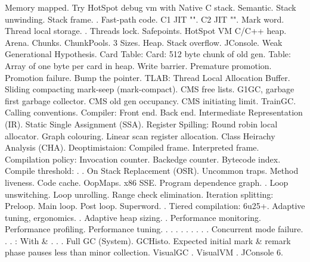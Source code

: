 \I Memory mapped.
\lskip
\I Try HotSpot debug vm with 
\I Native C stack.
\I Semantic.
\I Stack unwinding.
\I Stack frame.
\I {}.
\I Fast-path code.
\I C1 JIT "".
\I C2 JIT "".
\I Mark word.
\I Thread local storage.
\I {}.
\I Threads lock.
\I Safepoints.
\I HotSpot VM C/C++ heap.
\II Arena.
\II Chunks.
\II ChunkPools. 3 Sizes.
\I Heap.
\I {}
\I {}
\I {}
\I Stack overflow.
\I {}
\I JConsole.
\I Weak Generational Hypothesis.
\I Card Table:
\II Card: 512 byte chunk of old gen.
\II Table: Array of one byte per card in heap.
\I Write barrier.
\I Premature promotion.
\I Promotion failure.
\I Bump the pointer.
\I TLAB: Thread Local Allocation Buffer.
\I Sliding compacting mark-seep (mark-compact).
\I CMS free lists.
\I G1GC, garbage first garbage collector.
\I CMS old gen occupancy.
\I CMS initiating limit.
\I TrainGC.
\I Calling conventions.
\I Compiler:
\II Front end.
\II Back end.
\II Intermediate Representation (IR).
\II Static Single Assignment (SSA).
\I Register Spilling:
\II Round robin local allocator.
\II Graph colouring.
\II Linear scan register allocation.
\I Class Heirachy Analysis (CHA).
\I Deoptimistaion:
\II Compiled frame.
\II Interpreted frame.
\I Compilation policy:
\II Invocation counter.
\II Backedge counter.
\I Bytecode index.
\I Compile threshold:
\II {}.
\II {}.
\I On Stack Replacement (OSR).
\I Uncommon traps.
\I Method liveness.
\I Code cache.
\I OopMaps.
\I x86 SSE.
\I Program dependence graph.
\I {}.
\I Loop unswitching.
\I Loop unrolling.
\I Range check elimination.
\I Iteration splitting:
\II Preloop.
\II Main loop.
\II Post loop.
\I Superword.
\I {}.
\I Tiered compilation:
\II {} 6u25+.
\I Adaptive tuning, ergonomics.
\I {}.
\I Adaptive heap sizing.
\I {}.
\I Performance monitoring.
\I Performance profiling.
\I Performance tuning.
\I {}.
\I {}.
\I {}.
\I {}.
\I {}.
\I {}.
\I {}.
\I {}.
\I {}.
\I Concurrent mode failure.
\I {}.
\I {}.
\I {}:
\II With  \& .
\I {}.
\I {}.
\I Full GC (System).
\I GCHisto.
\I Expected initial mark \& remark phase pauses less than minor collection.
\I VisualGC .
\I VisualVM .
\I JConsole  \tw{<} 6.
\bye
